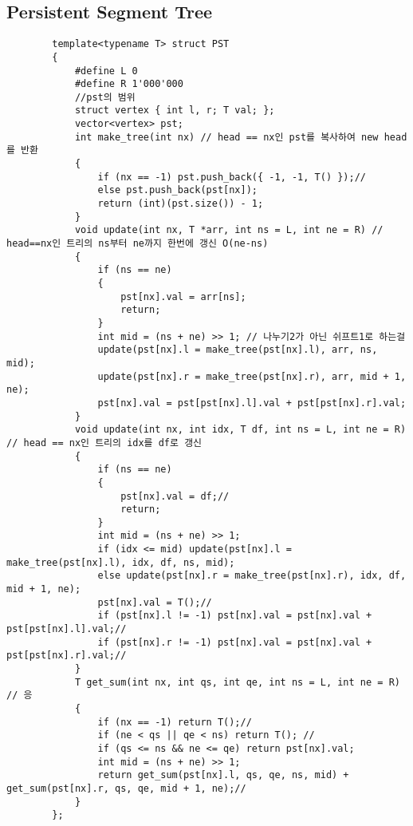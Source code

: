 \documentclass[landscape, 8pt, a4paper, oneside, twocolumn]{extarticle}
\begin{document}
	\subsection{Persistent Segment Tree}
	\begin{verbatim}
		template<typename T> struct PST
		{
			#define L 0
			#define R 1'000'000
			//pst의 범위
			struct vertex { int l, r; T val; };
			vector<vertex> pst;
			int make_tree(int nx) // head == nx인 pst를 복사하여 new head를 반환
			{
				if (nx == -1) pst.push_back({ -1, -1, T() });//
				else pst.push_back(pst[nx]);
				return (int)(pst.size()) - 1;
			}
			void update(int nx, T *arr, int ns = L, int ne = R) // head==nx인 트리의 ns부터 ne까지 한번에 갱신 O(ne-ns)
			{
				if (ns == ne)
				{
					pst[nx].val = arr[ns];
					return;
				}
				int mid = (ns + ne) >> 1; // 나누기2가 아닌 쉬프트1로 하는걸
				update(pst[nx].l = make_tree(pst[nx].l), arr, ns, mid);
				update(pst[nx].r = make_tree(pst[nx].r), arr, mid + 1, ne);
				pst[nx].val = pst[pst[nx].l].val + pst[pst[nx].r].val;
			}
			void update(int nx, int idx, T df, int ns = L, int ne = R) // head == nx인 트리의 idx를 df로 갱신
			{
				if (ns == ne)
				{
					pst[nx].val = df;//
					return;
				}
				int mid = (ns + ne) >> 1;
				if (idx <= mid) update(pst[nx].l = make_tree(pst[nx].l), idx, df, ns, mid);
				else update(pst[nx].r = make_tree(pst[nx].r), idx, df, mid + 1, ne);
				pst[nx].val = T();//
				if (pst[nx].l != -1) pst[nx].val = pst[nx].val + pst[pst[nx].l].val;//
				if (pst[nx].r != -1) pst[nx].val = pst[nx].val + pst[pst[nx].r].val;//
			}
			T get_sum(int nx, int qs, int qe, int ns = L, int ne = R) // 응
			{
				if (nx == -1) return T();//
				if (ne < qs || qe < ns) return T(); //
				if (qs <= ns && ne <= qe) return pst[nx].val;
				int mid = (ns + ne) >> 1;
				return get_sum(pst[nx].l, qs, qe, ns, mid) + get_sum(pst[nx].r, qs, qe, mid + 1, ne);//
			}
		};
	\end{verbatim}
\end{document}
